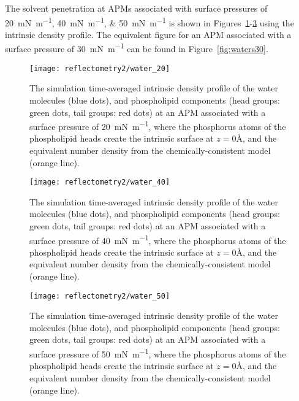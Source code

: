 The solvent penetration at APMs associated with surface pressures of \SIlist{20;40;50}{\milli\newton\per\meter} is shown in Figures~\ref{fig:waters20}-\ref{fig:waters50} using the intrinsic density profile. 
The equivalent figure for an APM associated with a surface pressure of \SI{30}{\milli\newton\per\meter} can be found in Figure~\ref{fig:waters30}.
%
\begin{figure}
    \centering
    \texttt{[image: reflectometry2/water\_20]}
    \caption{The simulation time-averaged intrinsic density profile of the water molecules (blue dots), and phospholipid components (head groups: green dots, tail groups: red dots) at an APM associated with a surface pressure of \SI{20}{\milli\newton\per\meter}, where the phosphorus atoms of the phospholipid heads create the intrinsic surface at $z=0$\si{\angstrom}, and the equivalent number density from the chemically-consistent model (orange line).}
    \label{fig:waters20}
\end{figure}
%
%
\begin{figure}
    \centering
    \texttt{[image: reflectometry2/water\_40]}
    \caption{The simulation time-averaged intrinsic density profile of the water molecules (blue dots), and phospholipid components (head groups: green dots, tail groups: red dots) at an APM associated with a surface pressure of \SI{40}{\milli\newton\per\meter}, where the phosphorus atoms of the phospholipid heads create the intrinsic surface at $z=0$\si{\angstrom}, and the equivalent number density from the chemically-consistent model (orange line).}
    \label{fig:waters40}
\end{figure}
%
%
\begin{figure}
    \centering
    \texttt{[image: reflectometry2/water\_50]}
    \caption{The simulation time-averaged intrinsic density profile of the water molecules (blue dots), and phospholipid components (head groups: green dots, tail groups: red dots) at an APM associated with a surface pressure of \SI{50}{\milli\newton\per\meter}, where the phosphorus atoms of the phospholipid heads create the intrinsic surface at $z=0$\si{\angstrom}, and the equivalent number density from the chemically-consistent model (orange line).}
    \label{fig:waters50}
\end{figure}
%

